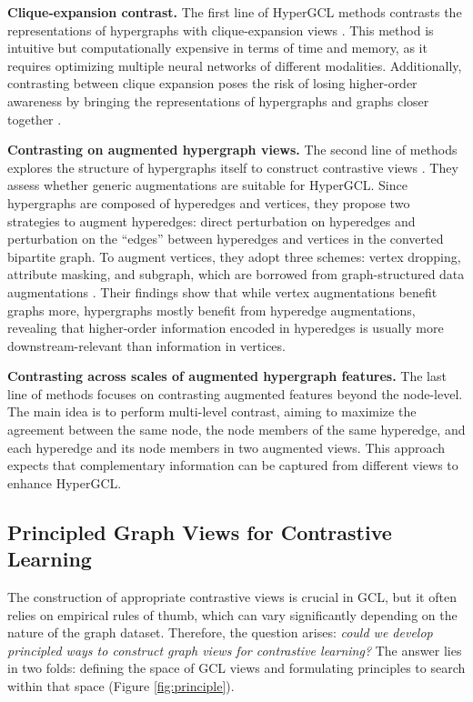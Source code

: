\documentclass[11pt]{article}
\begin{document}
\textbf{Clique-expansion contrast.}
The first line of HyperGCL methods contrasts the representations of hypergraphs with clique-expansion views \cite{xia2022hypergraph, cai2022hypergraph}. This method is intuitive but computationally expensive in terms of time and memory, as it requires optimizing multiple neural networks of different modalities. Additionally, contrasting between clique expansion poses the risk of losing higher-order awareness by bringing the representations of hypergraphs and graphs closer together \cite{wei2022augmentations}.

\textbf{Contrasting on augmented hypergraph views.}
The second line of methods explores the structure of hypergraphs itself to construct contrastive views \cite{wei2022augmentations}. They assess whether generic augmentations are suitable for HyperGCL. Since hypergraphs are composed of hyperedges and vertices, they propose two strategies to augment hyperedges: direct perturbation on hyperedges and perturbation on the ``edges'' between hyperedges and vertices in the converted bipartite graph. To augment vertices, they adopt three schemes: vertex dropping, attribute masking, and subgraph, which are borrowed from graph-structured data augmentations \cite{you2020graph}. Their findings show that while vertex augmentations benefit graphs more, hypergraphs mostly benefit from hyperedge augmentations, revealing that higher-order information encoded in hyperedges is usually more downstream-relevant than information in vertices.

\textbf{Contrasting across scales of augmented hypergraph features.}
The last line of methods \cite{lee2022m, song2023chgnn} focuses on contrasting augmented features beyond the node-level. The main idea is to perform multi-level contrast, aiming to maximize the agreement between the same node, the node members of the same hyperedge, and each hyperedge and its node members in two augmented views. This approach expects that complementary information can be captured from different views to enhance HyperGCL.

\subsection{Principled Graph Views for Contrastive Learning}
The construction of appropriate contrastive views is crucial in GCL, but it often relies on empirical rules of thumb, which can vary significantly depending on the nature of the graph dataset. Therefore, the question arises: \textit{could we develop principled ways to construct graph views for contrastive learning?} The answer lies in two folds: defining the space of GCL views and formulating principles to search within that space (Figure \ref{fig:principle}).
\end{document}
